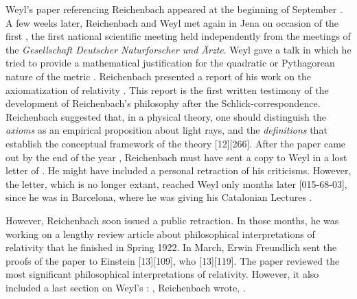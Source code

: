\documentclass[final]{article}
\begin{document}
Weyl's paper referencing Reichenbach appeared at the beginning of September \citep{Weyl1921e}. A few weeks later, Reichenbach and Weyl met again in Jena on occasion of the first  , the first national scientific meeting held independently from the meetings of the \textit{Gesellschaft Deutscher Naturforscher und Ärzte}. Weyl gave a talk in which he tried to provide a mathematical justification for the quadratic or Pythagorean nature of the metric \citep{Weyl1921f}. Reichenbach presented a report of his work on the axiomatization of relativity \citep{Reichenbach1921d}. This report is the first written testimony of the development of Reichenbach's philosophy after the Schlick-correspondence. Reichenbach suggested that, in a physical theory, one should distinguish the \emph{axioms} as an empirical proposition about light rays, \rac\etc and the \emph{definitions} that establish the conceptual framework of the theory [12][266]. After the paper came out by the end of the year \citep{Reichenbach1921d}, Reichenbach must have sent a copy to Weyl in a lost letter of . He might have included a personal retraction of his criticisms. However, the letter, which is no longer extant, reached Weyl only months later [015-68-03], since he was in Barcelona, where he was giving his Catalonian Lectures \citep{Weyl1923}.

However, Reichenbach soon issued a public retraction. In those months, he was working on a lengthy review article about philosophical interpretations of relativity that he finished in Spring 1922. In March, Erwin Freundlich sent the proofs of the paper  to Einstein [13][109], who  [13][119]. The paper reviewed the most significant philosophical interpretations of relativity. However, it also included a last section on Weyl's \uft: , Reichenbach wrote,  \citep[365]{Reichenbach1922a}.
\end{document}
